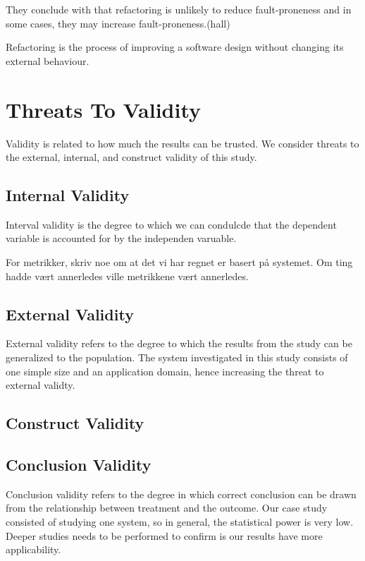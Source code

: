 They conclude with that refactoring is unlikely to reduce fault-proneness and in some cases, they may increase fault-proneness.(hall)

Refactoring is the process of improving a software design without changing its external behaviour\cite{fowler1999refactoring}. 



\section{Threats To Validity}
\label{sub:threats_to_validity}
Validity is related to how much the results can be trusted\cite{Wohlin:2000:ESE:330775}. We consider threats to the external, internal, and construct validity of this study.

\subsection{Internal Validity}
\label{sub:internal_validty}
Interval validity is the degree to which we can condulcde that the dependent variable is accounted for by the independen varuable.



For metrikker, skriv noe om at det vi har regnet er basert på systemet. Om ting hadde vært annerledes ville metrikkene vært annerledes.

\subsection{External Validity}
\label{sub:external_validity}
External validity refers to the degree to which the results from the study can be generalized to the population. The system investigated in this study consists of one simple size and an application domain, hence increasing the threat to external validty. 

\subsection{Construct Validity} %
\label{sub:construct_validity}

\subsection{Conclusion Validity} %
\label{sub:conclusion_validity}
Conclusion validity refers to the degree in which correct conclusion can be drawn from the relationship between treatment and the outcome. Our case study consisted of studying one system, so in general, the statistical power is very low. Deeper studies needs to be performed to confirm is our results have more applicability.


